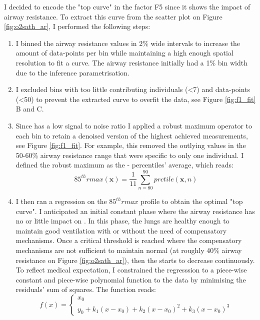 
I decided to encode the "top curve" in the factor F5 since it shows the impact of airway resistance. To extract this curve from the scatter plot on Figure \ref{fig:o2sath_ar}, I performed the following steps:
\begin{enumerate}
    \item I binned the airway resistance values in 2\% wide intervals to increase the amount of data-points per bin while maintaining a high enough spatial resolution to fit a curve. The airway resistance initially had a 1\% bin width due to the inference parametrisation.
    \item I excluded bins with too little contributing individuals (<7) and data-points (<50) to prevent the extracted curve to overfit the data, see Figure \ref{fig:f1_fit} B and C.
    \item Since \OXSat has a low signal to noise ratio I applied a robust maximum operator to each bin to retain a denoised version of the highest achieved \OXSatPrct measurements, see Figure \ref{fig:f1_fit}. For example, this removed the outlying values in the 50-60\% airway resistance range that were specific to only one individual. I defined the robust maximum as the - percentiles' average, which reads:
    \begin{equation*}
        85^{th}\!rmax(\bm{x}) = \frac{1}{11} \sum_{n=80}^{90}prctile(\bm{x}, n)
    \end{equation*}
    \item I then ran a regression on the $85^{th}\!rmax$ profile to obtain the optimal "top curve".  I anticipated an initial constant phase where the airway resistance has no or little impact on \OXSat. In this phase, the lungs are healthy enough to maintain good ventilation with or without the need of compensatory mechanisms. Once a critical threshold is reached where the compensatory mechanisms are not sufficient to maintain normal \PA (at roughly 40\% airway resistance on Figure \ref{fig:o2sath_ar}), then the \SP starts to decrease continuously. To reflect medical expectation, I constrained the regresssion to a piece-wise constant and piece-wise polynomial function to the data by minimising the residuals' sum of squares. The function reads:
\begin{equation*}
    f(x) = 
    \begin{cases}
        x_0 \\
        y_0 + k_1(x-x_0)+k_2(x-x_0)^2+k_3(x-x_0)^3
    \end{cases}
\end{equation*}
\end{enumerate}
